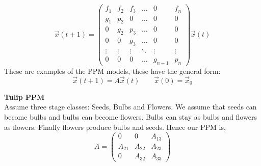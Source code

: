 $$ \vec x(t+1) = \begin{pmatrix}
  f_1 & f_2 & f_3 & \dots & 0 & f_n \\
  g_1 & p_2 & 0 & \dots & 0 & 0 \\
  0 & g_2 & p_3 & \dots  & 0 & 0 \\
  0 & 0 & g_3 & \dots  & 0 & 0 \\
  \vdots & \vdots & \vdots & \ddots & \vdots & \vdots \\
  0 & 0 & 0 & \dots & g_{n-1} & p_n
\end{pmatrix} \vec x(t)$$
These are examples of the PPM models, these have the general form:
$$ \vec x(t+1) = A\vec x(t) \qquad \vec x(0) = \vec x_0 $$
\begin{eg}
  \textbf{Tulip PPM}\\
  Assume three stage classes: Seeds, Bulbs and Flowers. We assume that seeds can become bulbs and bulbs can become flowers. Bulbs can stay as bulbs and flowers as flowers. Finally flowers produce bulbs and seeds. Hence our PPM is,
  $$ A = \begin{pmatrix}
    0 & 0 & A_{13} \\
    A_{21} & A_{22} & A_{23} \\
    0 & A_{32} & A_{33}
  \end{pmatrix} $$
\end{eg}

